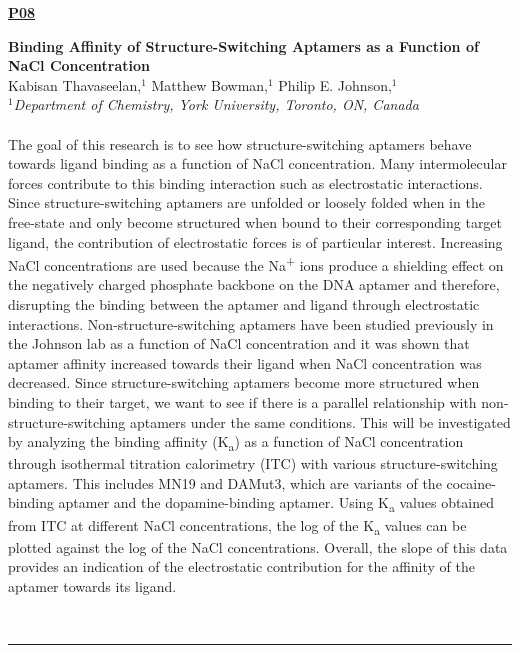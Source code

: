 \documentclass[titlepage,oneside,openany,10pt]{book}
\newenvironment{posterabs}[4] %
        {
	\begin{flushright}
                \underline{\textbf{#4}}
        \end{flushright}
        \textbf{#1}\\%
        #2\\%
        \textit{#3}\\\\%
        }
        {
        \\
        \noindent\rule{15cm}{0.5pt}%
        }
\begin{document}
\begin{posterabs}
	{Binding Affinity of Structure-Switching Aptamers as a Function of NaCl Concentration}
	{Kabisan Thavaseelan,$^{1}$ Matthew Bowman,$^{1}$ Philip E. Johnson,$^{1}$}
	{
	$^1$Department of Chemistry, York University, Toronto, ON, Canada
	}
	{P08}
	The goal of this research is to see how structure-switching aptamers behave towards ligand binding as a function of NaCl concentration. Many intermolecular forces contribute to this binding interaction such as electrostatic interactions. Since structure-switching aptamers are unfolded or loosely folded when in the free-state and only become structured when bound to their corresponding target ligand, the contribution of electrostatic forces is of particular interest. Increasing NaCl concentrations are used because the Na\textsuperscript{+} ions produce a shielding effect on the negatively charged phosphate backbone on the DNA aptamer and therefore, disrupting the binding between the aptamer and ligand through electrostatic interactions. Non-structure-switching aptamers have been studied previously in the Johnson lab as a function of NaCl concentration and it was shown that aptamer affinity increased towards their ligand when NaCl concentration was decreased. Since structure-switching aptamers become more structured when binding to their target, we want to see if there is a parallel relationship with non-structure-switching aptamers under the same conditions. This will be investigated by analyzing the binding affinity (K\textsubscript{a}) as a function of NaCl concentration through isothermal titration calorimetry (ITC) with various structure-switching aptamers. This includes MN19 and DAMut3, which are variants of the cocaine-binding aptamer and the dopamine-binding aptamer. Using K\textsubscript{a} values obtained from ITC at different NaCl concentrations, the log of the K\textsubscript{a} values can be plotted against the log of the NaCl concentrations. Overall, the slope of this data provides an indication of the electrostatic contribution for the affinity of the aptamer towards its ligand.
	\label{ThavaseelanK}
\end{posterabs}

\newpage
\end{document}
